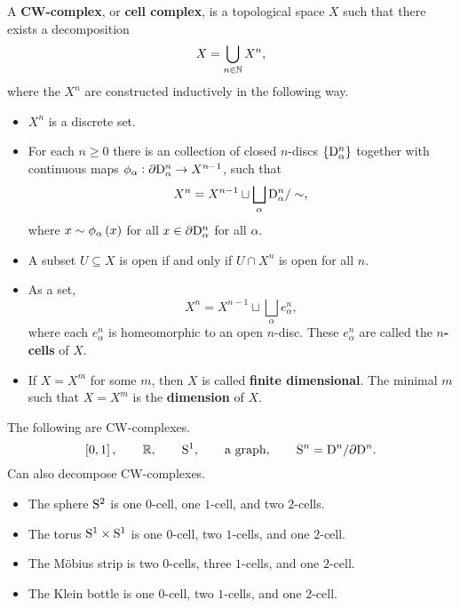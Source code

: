 \begin{definition*}
A \textbf{CW-complex}, or \textbf{cell complex}, is a topological space $ X $ such that there exists a decomposition
$$ X = \bigcup_{n \in \NN} X^n, $$
where the $ X^n $ are constructed inductively in the following way.
\begin{itemize}
\item $ X^n $ is a discrete set.
\item For each $ n \ge 0 $ there is an collection of closed $ n $-discs $ \cbr{\D_\alpha^n} $ together with continuous maps $ \phi_\alpha : \da \D_\alpha^n \to X^{n - 1} $, such that
$$ X^n = X^{n - 1} \sqcup \bigsqcup_\alpha \D_\alpha^n / \sim, $$
where $ x \sim \phi_\alpha\br{x} $ for all $ x \in \da \D_\alpha^n $ for all $ \alpha $.
\item A subset $ U \subseteq X $ is open if and only if $ U \cap X^n $ is open for all $ n $.
\end{itemize}
\end{definition*}

\pagebreak

\begin{remark*}
\hfill
\begin{itemize}
\item As a set,
$$ X^n = X^{n - 1} \sqcup \bigsqcup_\alpha e_\alpha^n, $$
where each $ e_\alpha^n $ is homeomorphic to an open $ n $-disc. These $ e_\alpha^n $ are called the \textbf{$ n $-cells} of $ X $.
\item If $ X = X^m $ for some $ m $, then $ X $ is called \textbf{finite dimensional}. The minimal $ m $ such that $ X = X^m $ is the \textbf{dimension} of $ X $.
\end{itemize}
\end{remark*}

\begin{example*}
The following are CW-complexes.
$$ \sbr{0, 1}, \qquad \RR, \qquad \S^1, \qquad \text{a graph}, \qquad \S^n = \D^n / \da \D^n. $$
Can also decompose CW-complexes.
\begin{itemize}
\item The sphere $ \S^2 $ is one $ 0 $-cell, one $ 1 $-cell, and two $ 2 $-cells.
\item The torus $ \S^1 \times \S^1 $ is one $ 0 $-cell, two $ 1 $-cells, and one $ 2 $-cell.
\item The M\"obius strip is two $ 0 $-cells, three $ 1 $-cells, and one $ 2 $-cell.
\item The Klein bottle is one $ 0 $-cell, two $ 1 $-cells, and one $ 2 $-cell.
\end{itemize}
\end{example*}

